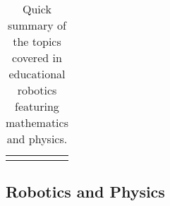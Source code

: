 \documentclass[conference]{IEEEtran}
\begin{document}
\begin{table}[h]
\begin{tabular}{ll}
                                                                                                                         
                                                                                                                         
                                                                                &                                        
                                                                                                                         
                                                                                          
\end{tabular}
\caption{Quick summary of the topics covered in educational robotics featuring mathematics and physics.}
\label{compactEDU}
\end{table}

\subsection{Robotics and Physics}
\end{document}
